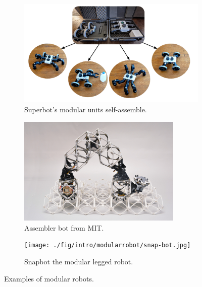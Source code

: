 \begin{figure}[t]
    \begin{subfigure}{1.0\textwidth}
        \centering
        \includegraphics[height=52mm]{./fig/intro/modularrobot/Eigenbot.png}
        \caption{Superbot’s modular units self-assemble. \cite{Eigenbot}}
        \label{Eigenbot}
    \end{subfigure}
    \begin{subfigure}{0.45\textwidth}
        \centering
        \includegraphics[height=52mm]{./fig/intro/modularrobot/MIT-Robot.jpg}
        \caption{Assembler bot from MIT. \cite{MITassembler}}
        \label{MITbot}
    \end{subfigure}
    \hfill
    \begin{subfigure}{0.45\textwidth}
        \centering
        \texttt{[image: ./fig/intro/modularrobot/snap-bot.jpg]}
        \caption{Snapbot the modular legged robot. \cite{snapbot1}}
        \label{snapbot}
    \end{subfigure}
    \vspace{2mm}
    \caption{Examples of modular robots.}
    \label{modular-robot}
\end{figure}


